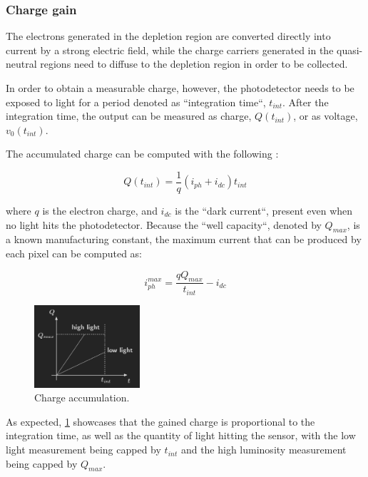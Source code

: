 \subsubsection{Charge gain}

The electrons generated in the depletion region are converted directly into current by a strong electric field,
while the charge carriers generated in the quasi-neutral regions need to diffuse to the depletion region in
order to be collected.

In order to obtain a measurable charge, however, the photodetector needs to be exposed to light for a period denoted
as ``integration time``, \(t_{int}\). After the integration time, the output can be measured as charge, \(Q(t_{int})\),
or as voltage, \(v_{0}(t_{int})\).

The accumulated charge can be computed with the following \cite{stanford}:

\begin{equation}
    \label{eqCharge}
    Q(t_{int}) = \frac{1}{q} (i_{ph} + i_{dc}) t_{int}
\end{equation}

where \(q\) is the electron charge, and \(i_{dc}\) is the ``dark current``, present even when no light hits the 
photodetector. Because the ``well capacity``, denoted by \(Q_{max}\), is a known manufacturing constant, the maximum
current that can be produced by each pixel can be computed as:

\begin{equation}
    \label{eqMaxCurr}
    i^{max}_{ph} = \frac{qQ_{max}}{t_{int}} - i_{dc}
\end{equation}

\begin{figure}[H]
    \includegraphics[width=0.35\textwidth, height=0.35\textwidth]{resources/png/integration.png}
    \caption{Charge accumulation. \cite{stanford} \label{figIntegration}}
\end{figure}

As expected, \ref{figIntegration} showcases that the gained charge is proportional to the integration time, as well
as the quantity of light hitting the sensor, with the low light measurement being capped by \(t_{int}\) and the high
luminosity measurement being capped by \(Q_{max}\).

